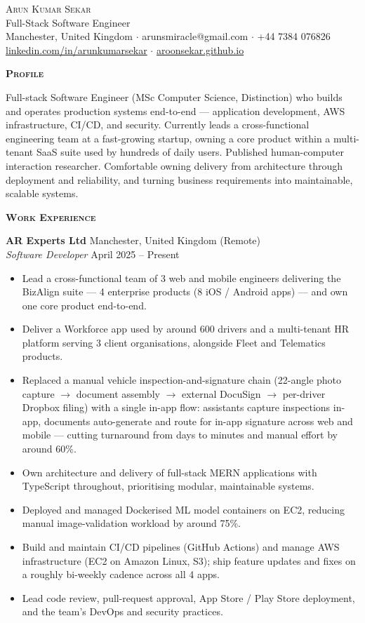 \documentclass[a4paper,10pt]{article}
\newcommand{\header}[1]{%
    \vspace*{6pt}%
    {\color{accent}\textbf{\scshape #1}}\hspace{4pt}%
    {\color{accent}\hrulefill}\par\vspace*{2pt}%
}
\begin{document}
\begin{center}
    {\Huge \scshape \color{accent} Arun Kumar Sekar}\\[4pt]
    {\large Full-Stack Software Engineer}\\[3pt]
    Manchester, United Kingdom $\cdot$ arunsmiracle@gmail.com $\cdot$ +44 7384 076826\\[1pt]
    \href{https://linkedin.com/in/arunkumarsekar/}{linkedin.com/in/arunkumarsekar} $\cdot$
    \href{https://aroonsekar.github.io/}{aroonsekar.github.io}
\end{center}
\vspace*{2pt}

\header{Profile}
Full-stack Software Engineer (MSc Computer Science, Distinction) who builds and operates production systems end-to-end --- application development, AWS infrastructure, CI/CD, and security. Currently leads a cross-functional engineering team at a fast-growing startup, owning a core product within a multi-tenant SaaS suite used by hundreds of daily users. Published human-computer interaction researcher. Comfortable owning delivery from architecture through deployment and reliability, and turning business requirements into maintainable, scalable systems.

\header{Work Experience}

\textbf{AR Experts Ltd} \hfill Manchester, United Kingdom (Remote)\\
\textit{Software Developer} \hfill April 2025 -- Present
\begin{itemize}
    \item Lead a cross-functional team of 3 web and mobile engineers delivering the BizAlign suite --- 4 enterprise products (8 iOS / Android apps) --- and own one core product end-to-end.
    \item Deliver a Workforce app used by around 600 drivers and a multi-tenant HR platform serving 3 client organisations, alongside Fleet and Telematics products.
    \item Replaced a manual vehicle inspection-and-signature chain (22-angle photo capture $\rightarrow$ document assembly $\rightarrow$ external DocuSign $\rightarrow$ per-driver Dropbox filing) with a single in-app flow: assistants capture inspections in-app, documents auto-generate and route for in-app signature across web and mobile --- cutting turnaround from days to minutes and manual effort by around 60\%.
    \item Own architecture and delivery of full-stack MERN applications with TypeScript throughout, prioritising modular, maintainable systems.
    \item Deployed and managed Dockerised ML model containers on EC2, reducing manual image-validation workload by around 75\%.
    \item Build and maintain CI/CD pipelines (GitHub Actions) and manage AWS infrastructure (EC2 on Amazon Linux, S3); ship feature updates and fixes on a roughly bi-weekly cadence across all 4 apps.
    \item Lead code review, pull-request approval, App Store / Play Store deployment, and the team's DevOps and security practices.
\end{itemize}
\end{document}
